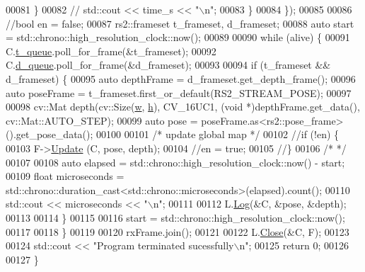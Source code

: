 \begin{DoxyCode}
00081             \}
00082             \textcolor{comment}{// std::cout << time\_s << "\(\backslash\)n";}
00083         \}
00084     \});
00085 
00086 \textcolor{comment}{//bool en = false;}
00087     rs2::frameset t\_frameset, d\_frameset;
00088     \textcolor{keyword}{auto} start = std::chrono::high\_resolution\_clock::now();
00089 
00090     \textcolor{keywordflow}{while} (alive) \{
00091         C.\hyperlink{classCamera_ad8a4c52c0ae125ab8ca66902408f5e95}{t\_queue}.poll\_for\_frame(&t\_frameset);
00092         C.\hyperlink{classCamera_a84a3a043e61b967fb1dc6fbe62bf33aa}{d\_queue}.poll\_for\_frame(&d\_frameset);
00093 
00094         \textcolor{keywordflow}{if} (t\_frameset && d\_frameset) \{
00095             \textcolor{keyword}{auto} depthFrame = d\_frameset.get\_depth\_frame();
00096             \textcolor{keyword}{auto} poseFrame  = t\_frameset.first\_or\_default(RS2\_STREAM\_POSE);
00097 
00098             cv::Mat depth(cv::Size(\hyperlink{Camera_8hpp_a66326676d44c838441a4dc39c85f599b}{w}, \hyperlink{Camera_8hpp_a3f40fea9b1040e381f08ddd4b026765d}{h}), CV\_16UC1, (\textcolor{keywordtype}{void} *)depthFrame.get\_data(), cv::Mat::AUTO\_STEP);
00099             \textcolor{keyword}{auto} pose = poseFrame.as<rs2::pose\_frame>().get\_pose\_data();
00100 
00101             \textcolor{comment}{/* update global map */}
00102             \textcolor{comment}{//if (!en) \{}
00103             F->\hyperlink{classMap__FE_a901af5011ef87bfd1dac3e568ef29c47}{Update} (C, pose, depth);
00104             \textcolor{comment}{//en = true;}
00105             \textcolor{comment}{//\}}
00106             \textcolor{comment}{/*                   */}
00107 
00108             \textcolor{keyword}{auto} elapsed = std::chrono::high\_resolution\_clock::now() - start;
00109             \textcolor{keywordtype}{float} microseconds = std::chrono::duration\_cast<std::chrono::microseconds>(elapsed).count();
00110             std::cout << microseconds << \textcolor{stringliteral}{"\(\backslash\)n"};
00111 
00112             L.\hyperlink{classLogger_adcc95257ff2edceded8e272dac3603ce}{Log}(&C, &pose, &depth);
00113 
00114         \}
00115 
00116         start = std::chrono::high\_resolution\_clock::now();
00117 
00118     \}
00119 
00120     rxFrame.join();
00121 
00122     L.\hyperlink{classLogger_a6b670ceb54a249eb83da08a1914d2be8}{Close}(&C, F);
00123 
00124     std::cout << \textcolor{stringliteral}{"Program terminated sucessfully\(\backslash\)n"};
00125     \textcolor{keywordflow}{return} 0;
00126     
00127 \}
\end{DoxyCode}
